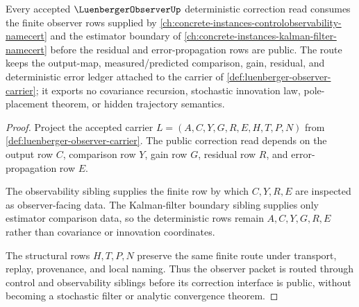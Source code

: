 \begin{theorem}
\label{thm:luenberger-observer-control-observability-forward-route}
Every accepted $\LuenbergerObserverUp$ deterministic correction read consumes the finite observer rows supplied by \autoref{ch:concrete-instances-controlobservability-namecert} and the estimator boundary of \autoref{ch:concrete-instances-kalman-filter-namecert} before the residual and error-propagation rows are public. The route keeps the output-map, measured/predicted comparison, gain, residual, and deterministic error ledger attached to the carrier of \autoref{def:luenberger-observer-carrier}; it exports no covariance recursion, stochastic innovation law, pole-placement theorem, or hidden trajectory semantics.
\end{theorem}
\begin{proof}
Project the accepted carrier $L=(A,C,Y,G,R,E,H,T,P,N)$ from \autoref{def:luenberger-observer-carrier}. The public correction read depends on the output row $C$, comparison row $Y$, gain row $G$, residual row $R$, and error-propagation row $E$.

The observability sibling supplies the finite row by which $C,Y,R,E$ are inspected as observer-facing data. The Kalman-filter boundary sibling supplies only estimator comparison data, so the deterministic rows remain $A,C,Y,G,R,E$ rather than covariance or innovation coordinates.

The structural rows $H,T,P,N$ preserve the same finite route under transport, replay, provenance, and local naming. Thus the observer packet is routed through control and observability siblings before its correction interface is public, without becoming a stochastic filter or analytic convergence theorem.
\end{proof}
